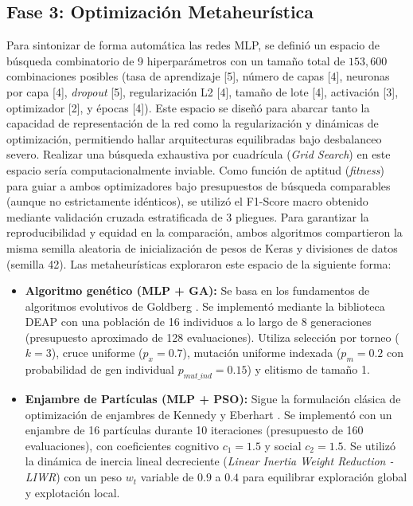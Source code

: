 \documentclass[conference]{IEEEtran}
\begin{document}
\subsection{Fase 3: Optimización Metaheurística}
Para sintonizar de forma automática las redes MLP, se definió un espacio de búsqueda combinatorio de 9 hiperparámetros con un tamaño total de $153,600$ combinaciones posibles (tasa de aprendizaje [5], número de capas [4], neuronas por capa [4], \textit{dropout} [5], regularización L2 [4], tamaño de lote [4], activación [3], optimizador [2], y épocas [4]). Este espacio se diseñó para abarcar tanto la capacidad de representación de la red como la regularización y dinámicas de optimización, permitiendo hallar arquitecturas equilibradas bajo desbalanceo severo. Realizar una búsqueda exhaustiva por cuadrícula (\textit{Grid Search}) en este espacio sería computacionalmente inviable. Como función de aptitud (\textit{fitness}) para guiar a ambos optimizadores bajo presupuestos de búsqueda comparables (aunque no estrictamente idénticos), se utilizó el F1-Score macro obtenido mediante validación cruzada estratificada de 3 pliegues. Para garantizar la reproducibilidad y equidad en la comparación, ambos algoritmos compartieron la misma semilla aleatoria de inicialización de pesos de Keras y divisiones de datos (semilla 42). Las metaheurísticas exploraron este espacio de la siguiente forma:
\begin{itemize}
    \item \textbf{Algoritmo genético (MLP + GA):} Se basa en los fundamentos de algoritmos evolutivos de Goldberg \cite{goldberg1989genetic}. Se implementó mediante la biblioteca DEAP \cite{fortin2012deap} con una población de 16 individuos a lo largo de 8 generaciones (presupuesto aproximado de 128 evaluaciones). Utiliza selección por torneo ($k=3$), cruce uniforme ($p_x=0.7$), mutación uniforme indexada ($p_m=0.2$ con probabilidad de gen individual $p_{mut\_ind}=0.15$) y elitismo de tamaño 1.
    \item \textbf{Enjambre de Partículas (MLP + PSO):} Sigue la formulación clásica de optimización de enjambres de Kennedy y Eberhart \cite{kennedy1995particle}. Se implementó con un enjambre de 16 partículas durante 10 iteraciones (presupuesto de 160 evaluaciones), con coeficientes cognitivo $c_1=1.5$ y social $c_2=1.5$. Se utilizó la dinámica de inercia lineal decreciente (\textit{Linear Inertia Weight Reduction - LIWR}) con un peso $w_t$ variable de $0.9$ a $0.4$ para equilibrar exploración global y explotación local.
\end{itemize}
\end{document}
